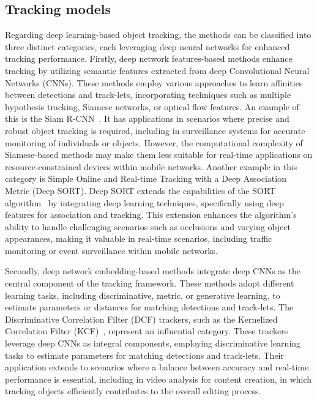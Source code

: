 \subsection{Tracking models}\label{subsec:track}

Regarding deep learning-based object tracking, the methods can be classified into three distinct categories, each leveraging deep neural networks for enhanced tracking performance.
Firstly, deep network features-based methods enhance tracking by utilizing semantic features extracted from deep Convolutional Neural Networks (CNNs).
These methods employ various approaches to learn affinities between detections and track-lets, incorporating techniques such as multiple hypothesis tracking, Siamese networks, or optical flow features.
An example of this is the Siam R-CNN~\cite{siam}.
It has applications in scenarios where precise and robust object tracking is required, including in surveillance systems for accurate monitoring of individuals or objects.
However, the computational complexity of Siamese-based methods may make them less suitable for real-time applications on resource-constrained devices within mobile networks.
Another example in this category is Simple Online and Real-time Tracking with a Deep Association Metric (Deep SORT)\cite{DeepSORT}.
Deep SORT extends the capabilities of the SORT algorithm~\cite{SORT} by integrating deep learning techniques, specifically using deep features for association and tracking.
This extension enhances the algorithm's ability to handle challenging scenarios such as occlusions and varying object appearances, making it valuable in real-time scenarios, including traffic monitoring or event surveillance within mobile networks.

Secondly, deep network embedding-based methods integrate deep CNNs as the central component of the tracking framework.
These methods adopt different learning tasks, including discriminative, metric, or generative learning, to estimate parameters or distances for matching detections and track-lets.
The Discriminative Correlation Filter (DCF) trackers, such as the Kernelized Correlation Filter (KCF)~\cite{KCF}, represent an influential category.
These trackers leverage deep CNNs as integral components, employing discriminative learning tasks to estimate parameters for matching detections and track-lets.
Their application extends to scenarios where a balance between accuracy and real-time performance is essential, including in video analysis for content creation, in which tracking objects efficiently contributes to the overall editing process.

